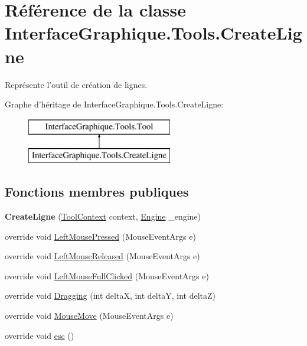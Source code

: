 \hypertarget{class_interface_graphique_1_1_tools_1_1_create_ligne}{\section{Référence de la classe Interface\-Graphique.\-Tools.\-Create\-Ligne}
\label{class_interface_graphique_1_1_tools_1_1_create_ligne}
}


Représente l'outil de création de lignes.  


Graphe d'héritage de Interface\-Graphique.\-Tools.\-Create\-Ligne\-:\begin{figure}[H]
\begin{center}
\leavevmode
\includegraphics[height=2.000000cm]{class_interface_graphique_1_1_tools_1_1_create_ligne}
\end{center}
\end{figure}
\subsection*{Fonctions membres publiques}
\begin{DoxyCompactItemize}
\item 
\hypertarget{class_interface_graphique_1_1_tools_1_1_create_ligne_a24d30cb295b58bdcfc7a96ee7b7a5259}{{\bfseries Create\-Ligne} (\hyperlink{class_interface_graphique_1_1_tools_1_1_tool_context}{Tool\-Context} context, \hyperlink{class_interface_graphique_1_1_engine}{Engine} \-\_\-engine)}\label{class_interface_graphique_1_1_tools_1_1_create_ligne_a24d30cb295b58bdcfc7a96ee7b7a5259}

\item 
override void \hyperlink{class_interface_graphique_1_1_tools_1_1_create_ligne_a952552e78bc24616026ecd5502dcd0ac}{Left\-Mouse\-Pressed} (Mouse\-Event\-Args e)
\item 
override void \hyperlink{class_interface_graphique_1_1_tools_1_1_create_ligne_aed5895d2081942fbe80022c99b8de5dc}{Left\-Mouse\-Released} (Mouse\-Event\-Args e)
\item 
override void \hyperlink{class_interface_graphique_1_1_tools_1_1_create_ligne_a5ea6ec82fe9e433ee36d6ca2fcbf6418}{Left\-Mouse\-Full\-Clicked} (Mouse\-Event\-Args e)
\item 
override void \hyperlink{class_interface_graphique_1_1_tools_1_1_create_ligne_a5862dbb249d4286c8663e47730a4ec0d}{Dragging} (int delta\-X, int delta\-Y, int delta\-Z)
\item 
override void \hyperlink{class_interface_graphique_1_1_tools_1_1_create_ligne_abc111e3dc2d9dfe15050d58631c45564}{Mouse\-Move} (Mouse\-Event\-Args e)
\item 
override void \hyperlink{class_interface_graphique_1_1_tools_1_1_create_ligne_ad332e361745a2425029bb2c09614d6ef}{esc} ()
\end{DoxyCompactItemize}
